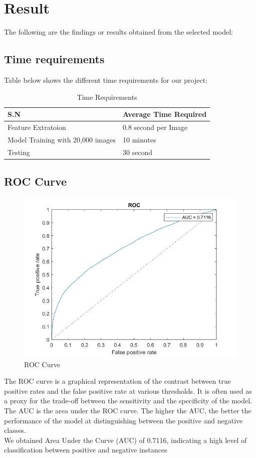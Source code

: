 \section{Result}
The following are the findings or results obtained from the selected model:
\subsection{Time requirements}
Table below shows the different time requirements for our project:
\begin{table}[H]
    \begin{tabular}{|l|l|}
    \hline
    S.N                & Average Time Required \\ \hline
    Feature Extratoion & 0.8 second per Image            \\ \hline
    Model Training with 20,000 images  & 10 minutes            \\ \hline
    Testing            & 30 second             \\ \hline
    \end{tabular}
    \caption{Time Requirements}
    \end{table}
\subsection{ROC Curve}
\begin{figure}[H]
    \centering
    \includegraphics[width=120mm]{./img/2600/roc2600.jpg}
    \caption{ROC Curve}
\end{figure}
The ROC curve is a graphical representation of the contrast between true positive rates and the false positive rate at various thresholds. It is often used as a proxy for the trade-off between the sensitivity and the specificity of the model. The AUC is the area under the ROC curve. The higher the AUC, the better the performance of the model at distinguishing between the positive and negative classes.\\
We obtained Area Under the Curve (AUC) of 0.7116, indicating a high level of classification between positive and negative instances
